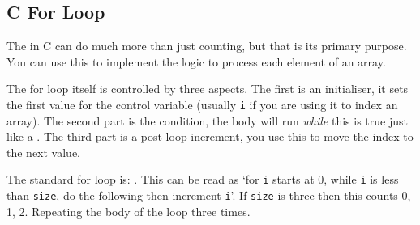 \clearpage
\subsection{C For Loop} %
\label{sub:c_for_loop}

The  in C can do much more than just counting, but that is its primary purpose. You can use this to implement the logic to process each element of an array.

The for loop itself is controlled by three aspects. The first is an initialiser, it sets the first value for the control variable (usually \texttt{i} if you are  using it to index an array). The second part is the condition, the body will run \emph{while} this is true just like a . The third part is a post loop increment, you use this to move the index to the next value. 

The standard for loop is: . This can be read as `for \texttt{i} starts at 0, while \texttt{i} is less than \texttt{size}, do the following then increment \texttt{i}'. If \texttt{size} is three then this counts 0, 1, 2. Repeating the body of the loop three times.




